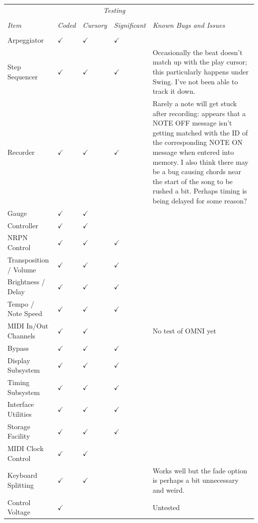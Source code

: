 \documentclass{article}
\begin{document}
\begin{center}
{
\setlength\extrarowheight{0.3em}
\begin{tabular}{@{}llllp{2.9in}@{}}
&&\multicolumn{2}{c}{\it Testing}&\\[0.1em]
\cline{3-4}\\[-0.9em]
{\it Item} & {\it Coded} & {\it Cursory} & {\it Significant} & {\it Known Bugs and Issues}\\[0.1em]
		\hline\\[-1.5em]
Arpeggiator& $\checkmark$ & $\checkmark$ & $\checkmark$  & \\
Step Sequencer& $\checkmark$ & $\checkmark$ & $\checkmark$ & Occasionally the beat doesn't match up with the play cursor; this particularly happens under Swing.  I've not been able to track it down.\\
Recorder& $\checkmark$ & $\checkmark$ & $\checkmark$ & Rarely a note will get stuck after recording: appears that a NOTE OFF message isn't getting matched with the ID of the corresponding NOTE ON message when entered into memory.  
I also think there may be a bug causing chords near the start of the song to be rushed a bit.  Perhaps timing is being delayed for some reason?\\
Gauge& $\checkmark$ & $\checkmark$ &\\ 
Controller& $\checkmark$ & $\checkmark$ & & \\ 
NRPN Control  &  $\checkmark$ & $\checkmark$ &  $\checkmark$ &\\
Transposition / Volume  &  $\checkmark$ & $\checkmark$ &  $\checkmark$ &\\
Brightness / Delay  &  $\checkmark$ & $\checkmark$ &  $\checkmark$ &\\
Tempo / Note Speed &  $\checkmark$ & $\checkmark$ &  $\checkmark$ &\\
MIDI In/Out Channels &  $\checkmark$ & $\checkmark$ &  & No test of OMNI yet\\
Bypass &  $\checkmark$ & $\checkmark$ &  $\checkmark$ &\\
Display Subsystem  &  $\checkmark$ & $\checkmark$ &  $\checkmark$ &\\
Timing  Subsystem &  $\checkmark$ & $\checkmark$ &  $\checkmark$ &\\
Interface Utilities &  $\checkmark$ & $\checkmark$ &  $\checkmark$ & \\
Storage Facility &  $\checkmark$ & $\checkmark$ &  $\checkmark$ &\\
MIDI Clock Control& $\checkmark$ & $\checkmark$ & &\\
Keyboard Splitting& $\checkmark$ & $\checkmark$  & & Works well but the fade option is perhaps a bit unnecessary and weird.\\
Control Voltage& $\checkmark$ & & & Untested\\
\end{tabular}
}
\end{center}
\end{document}
